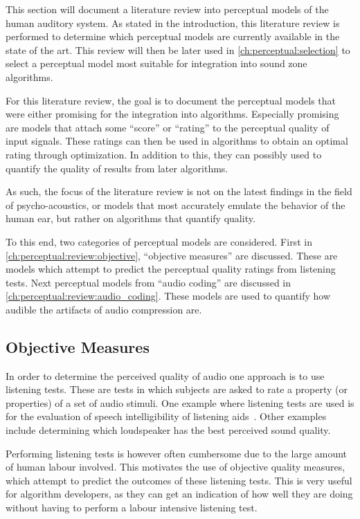 This section will document a literature review into perceptual models of the human auditory system.
As stated in the introduction, this literature review is performed to determine which perceptual models are currently 
available in the state of the art.
This review will then be later used in \autoref{ch:perceptual:selection} to select a perceptual model most 
suitable for integration into sound zone algorithms.

For this literature review, the goal is to document the perceptual models that were either promising for 
the integration into algorithms.
Especially promising are models that attach some ``score'' or ``rating'' to the perceptual quality of input signals.
These ratings can then be used in algorithms to obtain an optimal rating through optimization.
In addition to this, they can possibly used to quantify the quality of results from later algorithms.

As such, the focus of the literature review is not on the latest findings in the field of psycho-acoustics, or models 
that most accurately emulate the behavior of the human ear, but rather on algorithms that quantify quality.

To this end, two categories of perceptual models are considered.
First in \autoref{ch:perceptual:review:objective}, ``objective measures'' are discussed.
These are models which attempt to predict the perceptual quality ratings from listening tests. 
Next perceptual models from ``audio coding'' are discussed in \autoref{ch:perceptual:review:audio_coding}.
These models are used to quantify how audible the artifacts of audio compression are.

\subsection{Objective Measures}
\label{ch:perceptual:review:objective}
In order to determine the perceived quality of audio one approach is to use listening tests.
These are tests in which subjects are asked to rate a property (or properties) of a set of audio stimuli.
One example where listening tests are used is for the evaluation of speech intelligibility of listening aids~\cite{taal2011algorithm}.
Other examples include determining which loudspeaker has the best perceived sound quality.

Performing listening tests is however often cumbersome due to the large amount of human labour involved.
This motivates the use of objective quality measures, which attempt to predict the outcomes of these listening tests.
This is very useful for algorithm developers, as they can get an indication of how well they are doing
without having to perform a labour intensive listening test.


